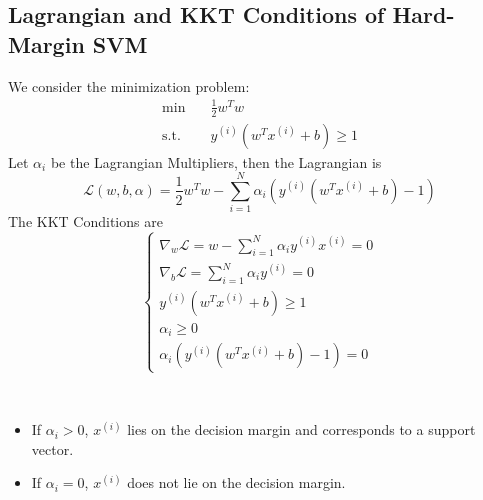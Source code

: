     \subsection{Lagrangian and KKT Conditions of Hard-Margin SVM}
        We consider the minimization problem:
        \begin{align*}
             \min \quad &\frac{1}{2}w^Tw\\
             \text{s.t.} \quad & y^{(i)}(w^Tx^{(i)}+b) \ge 1
        \end{align*}
        Let $\alpha_i$ be the Lagrangian Multipliers, then the Lagrangian is
        \[ \mathcal{L}(w,b,\alpha) = \frac{1}{2}w^Tw - \sum_{i=1}^N \alpha_i (y^{(i)}(w^Tx^{(i)} + b) - 1) \]
        The KKT Conditions are
        \[
        \begin{cases}
            \nabla_w \mathcal{L} = w - \sum_{i=1}^N \alpha_i y^{(i)}x^{(i)} = 0\\
            \nabla_b \mathcal{L} = \sum_{i=1}^N \alpha_i y^{(i)} = 0\\
            y^{(i)}(w^Tx^{(i)} + b) \ge 1\\
            \alpha_i \ge 0\\
            \alpha_i(y^{(i)}(w^Tx^{(i)} + b) - 1) =0
        \end{cases}    
        \]
        \begin{remark}~{}
            \begin{itemize}
                \item If $\alpha_i > 0$, $x^{(i)}$ lies on the decision margin and corresponds to a support vector.
                \item If $\alpha_i = 0$, $x^{(i)}$ does not lie on the decision margin.
            \end{itemize}
        \end{remark}

